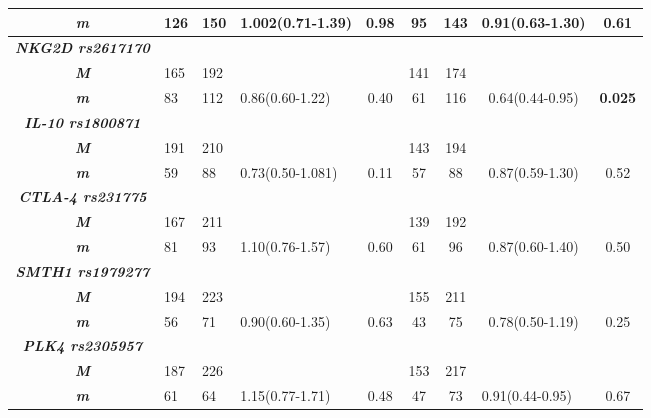 \begin{table}[!ht]
{\begin{tabular}{clllccccl}
\textit{\textbf{m}} & 126 & 150 &  1.002(0.71-1.39) & 0.98 & 95 & 143 &
0.91(0.63-1.30) & \multicolumn{1}{c}{0.61} \\ \hline
\textit{\textbf{NKG2D rs2617170}} &&&&& \multicolumn{1}{l}{} & \multicolumn{1}{l}{} & \multicolumn{1}{l}{} & \\ \hline
\textit{\textbf{M}} & 165 & 192 & & & 141 & 174 & \multicolumn{1}{l}{} & \\ \hline \textit{\textbf{m}} & 83 & 112 & 0.86(0.60-1.22) & 0.40 & 61 & 116 & 0.64(0.44-0.95) & \multicolumn{1}{c}{\textbf{0.025}} \\ \hline
\textit{\textbf{IL-10 rs1800871}} &&& && \multicolumn{1}{l}{} & \multicolumn{1}{l}{} &  \multicolumn{1}{l}{} & \\ \hline
\textit{\textbf{M}} & 191 & 210 & & & 143 & 194 & & \\ \hline
\textit{\textbf{m}} & 59 & 88 & 0.73(0.50-1.081) & 0.11 & 57 & 88 & 0.87(0.59-1.30) & \multicolumn{1}{c}{0.52} \\ \hline
\textit{\textbf{CTLA-4 rs231775}} & & & & \multicolumn{1}{l}{} & \multicolumn{1}{l}{} & \multicolumn{1}{l}{} & \multicolumn{1}{l}{} & \\ \hline
\textit{\textbf{M}} & 167 & 211 & & & 139 & 192 & \multicolumn{1}{l}{} &\\ \hline \textit{\textbf{m}} & 81 & 93 & 1.10(0.76-1.57) & 0.60 & 61 & 96 & 0.87(0.60-1.40) & \multicolumn{1}{c}{0.50} \\ \hline \textit{\textbf{SMTH1 rs1979277}} & & & & & & & \multicolumn{1}{l}{} & \\ \hline
\textit{\textbf{M}} & 194 & 223 & & & 155 & 211 & & \\ \hline \textit{\textbf{m}} & 56 & 71 & 0.90(0.60-1.35) & 0.63 & 43 & 75 & 0.78(0.50-1.19) & \multicolumn{1}{c}{0.25} \\ \hline \textit{\textbf{PLK4 rs2305957}} & & & & & & & \multicolumn{1}{l}{} & \\ \hline
\textit{\textbf{M}} & 187 & 226 & & & 153 & 217 & & \\ \hline
\textit{\textbf{m}} & 61 & 64 & 1.15(0.77-1.71) & 0.48 & 47 & 73 & \multicolumn{1}{l}{0.91(0.44-0.95)} & \multicolumn{1}{c}{0.67} \\ \hline
\end{tabular}%
}
\label{tab:Allele analysis in WBC and CV}
\end{table}


